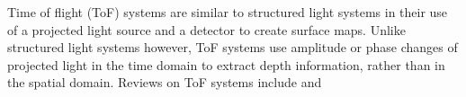 \documentclass[class=article, crop=false]{standalone}
\begin{document}
Time of flight (ToF) systems are similar to structured light systems in their use of a projected light source and a detector to create surface maps. Unlike structured light systems however, ToF systems use amplitude or phase changes of projected light in the time domain to extract depth information, rather than in the spatial domain. Reviews on ToF systems include \cite{Horaud2016} and \cite{tofbook}
\end{document}
